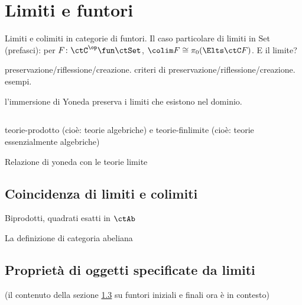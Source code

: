 \section{Limiti e funtori}
Limiti e colimiti in categorie di funtori. Il caso particolare di limiti in Set (prefasci): per \(F \colon \ctC^\op\fun\ctSet\), \(\colim F\cong \pi_0(\Elts\ctC F)\). E il limite?

preservazione/riflessione/creazione. criteri di preservazione/riflessione/creazione. esempi.

l'immersione di Yoneda preserva i limiti che esistono nel dominio.



\subsection{}
teorie-prodotto (cioè: teorie algebriche) e teorie-finlimite (cioè: teorie essenzialmente algebriche)

Relazione di yoneda con le teorie limite
\subsection{Coincidenza di limiti e colimiti}
Biprodotti, quadrati esatti in \(\ctAb\)

La definizione di categoria abeliana
\subsection{Proprietà di oggetti specificate da limiti}
\begin{definition}
	\Todo{}
\end{definition}
(il contenuto della sezione \ref{} su funtori iniziali e finali ora è in contesto)
\begin{definition}
	\Todo{}
\end{definition}
\begin{definition}
	\Todo{}
\end{definition}
\begin{definition}
	\Todo{}
	
\end{definition}
\begin{definition}
	\Todo{}
	
\end{definition}
\begin{definition}
	\Todo{}
	
\end{definition}





